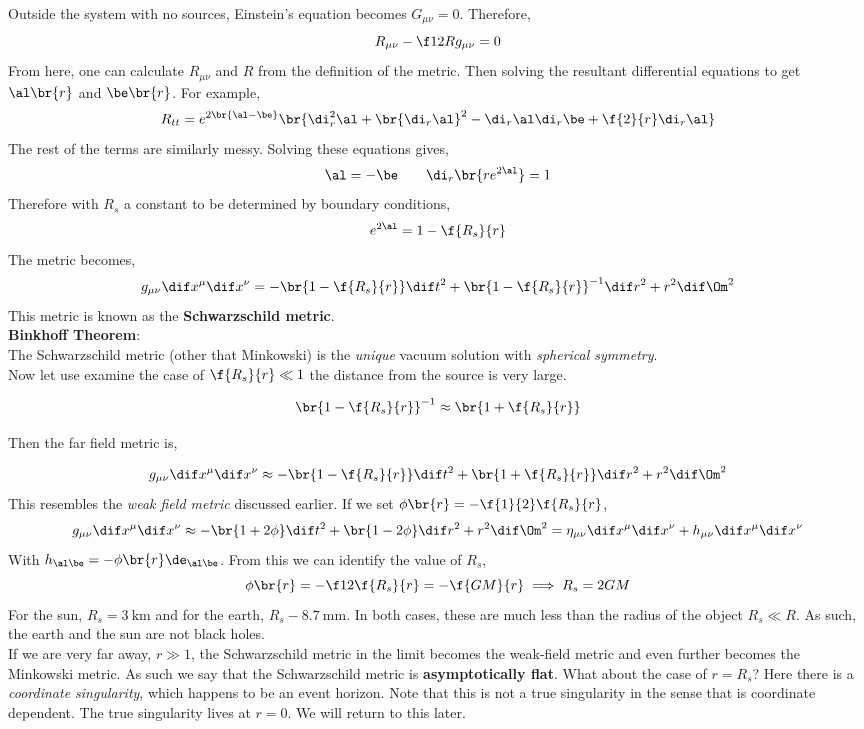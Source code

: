 \documentclass{article}
\begin{document}
Outside the system with no sources, Einstein's equation becomes $G_{\mu\nu} = 0$. Therefore,
\[ R_{\mu\nu} - \f12 R g_{\mu\nu} = 0 \]
From here, one can calculate $R_{\mu\nu}$ and $R$ from the definition of the metric. Then solving the resultant differential equations to get $\al\br{r}$ and $\be\br{r}$. For example,
\[ R_{tt} = e^{2\br{\al-\be}}\br{\di_r^2 \al + \br{\di_r \al}^2 - \di_r \al \di_r \be + \f{2}{r} \di_r \al} \]
The rest of the terms are similarly messy. Solving these equations gives,
\[ \al = - \be \qquad \di_r \br{r e^{2\al}} = 1 \]
Therefore with $R_s$ a constant to be determined by boundary conditions,
\[ e^{2\al} = 1 - \f{R_s}{r} \]
The metric becomes,
\[  g_{\mu\nu} \dif x^\mu \dif x^\nu = - \br{1 - \f{R_s}{r}} \dif t^2 + \br{1 - \f{R_s}{r}}^{-1} \dif r^2 + r^2 \dif\Om^2\]
This metric is known as the \textbf{Schwarzschild metric}. \\

\textbf{Binkhoff Theorem}:\\
The Schwarzschild metric (other that Minkowski) is the \textit{unique} vacuum solution with \textit{spherical symmetry}. \\

Now let use examine the case of $\f{R_s}{r} \ll 1$ the distance from the source is very large.

\[ \br{1-\f{R_s}{r}}^{-1} \approx \br{1 + \f{R_s}{r}} \]

Then the far field metric is,

\[ g_{\mu\nu} \dif x^\mu \dif x^\nu  \approx -\br{1-\f{R_s}{r}} \dif t^2 + \br{1+\f{R_s}{r}} \dif r^2 + r^2 \dif \Om^2 \]
This resembles the \textit{weak field metric} discussed earlier. If we set $\phi\br{r} = -\f{1}{2}\f{R_s}{r}$,
\[ g_{\mu\nu} \dif x^\mu \dif x^\nu  \approx -\br{1+2\phi} \dif t^2 + \br{1-2\phi} \dif r^2 + r^2 \dif \Om^2  = \eta_{\mu\nu} \dif x^\mu \dif x^\nu + h_{\mu\nu} \dif x^\mu \dif x^\nu\]
With $h_{\al\be} = - \phi\br{r} \de_{\al\be}$. From this we can identify the value of $R_s$,
\[ \phi\br{r} = -\f12 \f{R_s}{r} = - \f{GM}{r} \implies R_s = 2GM \]
For the sun, $R_s = \SI{3}{\km}$ and for the earth, $R_s - \SI{8.7}{\mm}$. In both cases, these are much less than the radius of the object $R_s \ll R$. As such, the earth and the sun are not black holes. \\

If we are very far away, $r \gg 1$, the Schwarzschild metric in the limit becomes the weak-field metric and even further becomes the Minkowski metric. As such we say that the Schwarzschild metric is \textbf{asymptotically flat}. What about the case of $r = R_s$? Here there is a \textit{coordinate singularity}, which happens to be an event horizon. Note that this is not a true singularity in the sense that is coordinate dependent. The true singularity lives at $r=0$. We will return to this later.\\
\end{document}
